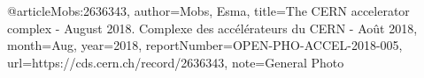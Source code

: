 @article{Mobs:2636343,
	author={Mobs, Esma},
	title={The {CERN} accelerator complex - August 2018. Complexe des acc\'{e}l\'{e}rateurs du {CERN} - Ao\^{u}t 2018},
	month={Aug},
	year={2018},
	reportNumber={OPEN-PHO-ACCEL-2018-005},
	url={https://cds.cern.ch/record/2636343},
	note={General Photo}
}